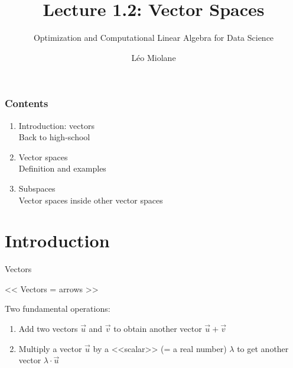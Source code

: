 \documentclass{beamer}
\title{Lecture 1.2: Vector Spaces}
\subtitle{Optimization and Computational Linear Algebra for Data Science}
\author{Léo Miolane}
\date{}
\begin{document}
\setcounter{showProgressBar}{0}
\setcounter{showSlideNumbers}{0}

\frame{\titlepage}

\begin{frame}
	\frametitle{Contents}
	\begin{enumerate}
		\item Introduction: vectors \\ \textcolor{ExecusharesGrey}{\footnotesize\hspace{1em} Back to high-school}
		\item Vector spaces  \\ \textcolor{ExecusharesGrey}{\footnotesize\hspace{1em} Definition and examples}
		\item Subspaces \\ \textcolor{ExecusharesGrey}{\footnotesize\hspace{1em} Vector spaces inside other vector spaces}
	\end{enumerate}
\end{frame}


\setcounter{framenumber}{0}
\setcounter{showSlideNumbers}{1}

\section{Introduction}

\begin{frame}[t]{Vectors}
	\begin{center}
		<< Vectors = arrows >>
	\end{center}
	\noindent Two fundamental operations:
	\vspace{0.1cm}
	\begin{enumerate}
		\item Add two vectors $\vec{u}$ and $\vec{v}$ to obtain another vector $\vec{u} + \vec{v}$
			\vspace{2.2cm}
		\item Multiply a vector $\vec{u}$ by a <<scalar>> (= a real number) $\lambda$ to get another vector $\lambda \cdot \vec{u}$
			\vspace{2.2cm}
	\end{enumerate}
\end{frame}
\end{document}
